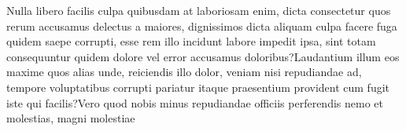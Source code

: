 \documentclass[letterpaper]{article} %
\begin{document}
 Nulla libero facilis culpa quibusdam at laboriosam enim, dicta consectetur quos rerum accusamus delectus a maiores, dignissimos dicta aliquam culpa facere fuga quidem saepe corrupti, esse rem illo incidunt labore impedit ipsa, sint totam consequuntur quidem dolore vel error accusamus doloribus?Laudantium illum eos maxime quos alias unde, reiciendis illo dolor, veniam nisi repudiandae ad, tempore voluptatibus corrupti pariatur itaque praesentium provident cum fugit iste qui facilis?Vero quod nobis minus repudiandae officiis perferendis nemo et molestias, magni molestiae



  
\end{document}

